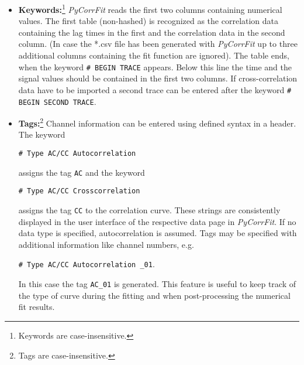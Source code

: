 \begin{itemize}
\begin{itemize}
\item Time: \SI{1}{ms}
\item Intensity: \SI{1}{kHz}
\item Amplitude offset: $G(0) = 0$ (not 1)
\end{itemize}
\item \textbf{Keywords:}\footnote{Keywords are case-insensitive.} \textit{PyCorrFit} reads the first two columns containing numerical values. The first table (non-hashed) is recognized as the correlation data containing the lag times in the first and the correlation data in the second column. (In case the *.csv file has been generated with \textit{PyCorrFit} up to three additional columns containing the fit function are ignored). The table ends, when the keyword \texttt{\# BEGIN TRACE} appears. Below this line the time and the signal values should be contained in the first two columns. If cross-correlation data have to be imported a second trace can be entered after the keyword \texttt{\# BEGIN SECOND TRACE}.
\item \textbf{Tags:}\footnote{Tags are case-insensitive.} Channel information can be entered using defined syntax in a header. The keyword 
\begin{center}
\vspace{-1em}
 \texttt{\# Type AC/CC Autocorrelation}
\vspace{-1em}
\end{center}
  assigns the tag \texttt{AC} and the keyword
\begin{center}
\vspace{-1em}
  {\texttt{\# Type AC/CC Crosscorrelation}}
\vspace{-1em}
\end{center}
 assigns the tag \texttt{CC} to the correlation curve. These strings are consistently displayed in the user interface of the respective data page in \textit{PyCorrFit}. If no data type is specified, autocorrelation is assumed. Tags may be specified with additional information like channel numbers, e.g. 
\begin{center}
\vspace{-1em}
 \texttt{\# Type AC/CC Autocorrelation \_01}.
\vspace{-1em}
\end{center}
In this case the tag \texttt{AC\_01} is generated. This feature is useful to keep track of the type of curve during the fitting and when post-processing the numerical fit results.
\end{itemize}

